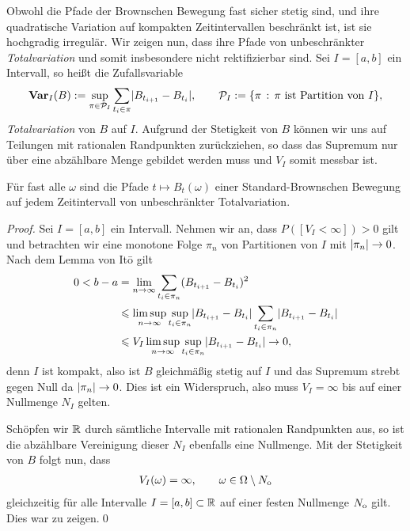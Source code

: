 Obwohl die Pfade der Brownschen Bewegung fast sicher stetig sind, und ihre
quadratische Variation auf kompakten Zeitintervallen beschränkt ist, ist sie
hochgradig irregulär. Wir zeigen nun, dass ihre Pfade von unbeschränkter
\emph{Totalvariation} und somit insbesondere nicht rektifizierbar sind.
Sei $I=[a,b]$ ein Intervall, so heißt die Zufallsvariable
\begin{align*}
\Var_I(B) \defl \sup_{\pi\in\PP_I} \sum_{t_i\in \pi}
\abs{B_{t_{i+1}}-B_{t_i}},\qquad \PP_I\defl \setdef{\pi}{\pi\text{ ist
Partition von }I},
\end{align*}
\emph{Totalvariation} von $B$ auf $I$. Aufgrund der Stetigkeit von $B$ können
wir uns auf Teilungen mit rationalen Randpunkten zurückziehen, so dass das
Supremum nur über eine abzählbare Menge gebildet werden muss und $V_I$ somit
messbar ist.

\begin{prop}
  Für fast alle $\omega$ sind die Pfade $t\mapsto B_t(\omega)$ einer
  Standard-Brownschen Bewegung auf jedem Zeitintervall von unbeschränkter
  Totalvariation.
\end{prop}

\begin{proof}
Sei $I=[a,b]$ ein Intervall. Nehmen wir an, dass $P([V_I < \infty]) >
0$ gilt und betrachten wir eine monotone Folge $\pi_n$ von Partitionen von $I$
mit $\lvert\pi_n\rvert\to 0$. Nach dem Lemma von Itō gilt
\begin{align*}
0 < b-a &= \lim\limits_{n\to\infty} \sum_{t_i\in \pi_n}
(B_{t_{i+1}}-B_{t_i})^2\\
& \leqslant \limsup_{n\to\infty} \sup_{t_i\in \pi_n} \lvert B_{t_{i+1}}-B_{t_i}\rvert
\sum_{t_i \in \pi_n} \lvert B_{t_{i+1}}-B_{t_i}\rvert\\
&\leqslant V_I \limsup_{n\to\infty} \sup_{t_i\in \pi_n} \lvert B_{t_{i+1}}-B_{t_i}\rvert\to
0,
\end{align*}
denn $I$ ist kompakt, also ist $B$ gleichmäßig stetig auf $I$ und das Supremum
strebt gegen Null da $\lvert\pi_n\rvert\to 0$.
Dies ist ein Widerspruch, also muss $V_I=\infty$ bis auf einer Nullmenge $N_I$
gelten.

Schöpfen wir $\mathbb{R}$ durch sämtliche Intervalle mit rationalen Randpunkten aus, so
ist die abzählbare Vereinigung dieser $N_I$ ebenfalls eine Nullmenge. 
Mit der Stetigkeit von $B$ folgt nun, dass
\begin{align*}
V_I(\omega) = \infty,\qquad \omega\in\Omega\setminus N_{\mathrm{o}} 
\end{align*} 
gleichzeitig für alle Intervalle $I=[a,b]\subset \mathbb{R}$ auf einer festen Nullmenge
$N_{\mathrm{o}}$ gilt. Dies war zu zeigen.\qed
\end{proof}

